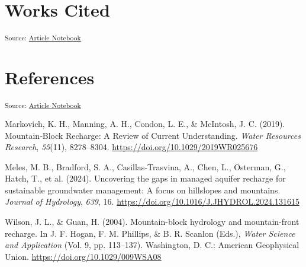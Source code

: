 \documentclass[
]{agujournal2019}
\newlength{\cslhangindent}
\newenvironment{CSLReferences}[2] %
 {\begin{list}{}{%
  \setlength{\itemindent}{0pt}
  \setlength{\leftmargin}{0pt}
  \setlength{\parsep}{0pt}
  \ifodd #1
   \setlength{\leftmargin}{\cslhangindent}
   \setlength{\itemindent}{-1\cslhangindent}
  \fi
  \setlength{\itemsep}{#2\baselineskip}}}
 {\end{list}}
\begin{document}
\section{Works Cited}\label{works-cited}

\textsubscript{Source:
\href{https://Ryan3Lima.github.io/ATUR-ORE/index.ipynb.html}{Article
Notebook}}

\section*{References}\label{references}

\vspace{1em}

\textsubscript{Source:
\href{https://Ryan3Lima.github.io/ATUR-ORE/index.ipynb.html}{Article
Notebook}}

\label{refs}
\begin{CSLReferences}{1}{0}
Markovich, K. H., Manning, A. H., Condon, L. E., \& McIntosh, J. C.
(2019). Mountain‐{Block} {Recharge}: {A} {Review} of {Current}
{Understanding}. \emph{Water Resources Research}, \emph{55}(11),
8278--8304. \url{https://doi.org/10.1029/2019WR025676}

Meles, M. B., Bradford, S. A., Casillas-Trasvina, A., Chen, L.,
Osterman, G., Hatch, T., et al. (2024). Uncovering the gaps in managed
aquifer recharge for sustainable groundwater management: {A} focus on
hillslopes and mountains. \emph{Journal of Hydrology}, \emph{639}, 16.
\url{https://doi.org/10.1016/J.JHYDROL.2024.131615}

Wilson, J. L., \& Guan, H. (2004). Mountain-block hydrology and
mountain-front recharge. In J. F. Hogan, F. M. Phillips, \& B. R.
Scanlon (Eds.), \emph{Water {Science} and {Application}} (Vol. 9, pp.
113--137). Washington, D. C.: American Geophysical Union.
\url{https://doi.org/10.1029/009WSA08}

\end{CSLReferences}
\end{document}
